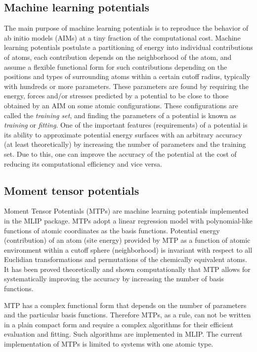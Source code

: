 \documentclass[12pt]{article}
\renewcommand{\_}{\char`_}
\begin{document}
\subsection{Machine learning potentials}

The main purpose of machine learning potentials is to reproduce the behavior of ab initio models (AIMs) at a tiny fraction of the computational cost.
Machine learning potentials postulate a partitioning of energy into individual contributions of atoms, each contribution depends on the neighborhood of the atom, and assume a flexible functional form for such contributions depending on the positions and types of surrounding atoms within a certain cutoff radius, typically with hundreds or more parameters. These parameters are found by requiring the energy, forces and/or stresses predicted by a potential to be close to those obtained by an AIM on some atomic configurations. These configurations are called the \emph{training set}, and finding the parameters of a potential is known as \emph{training} or \emph{fitting}. One of the important features (requirements) of a potential is its ability to approximate potential energy surfaces with an arbitrary accuracy (at least theoretically) by increasing the number of parameters and the training set. Due to this, one can improve the accuracy of the potential at the cost of reducing its computational efficiency and vice versa.

\subsection{Moment tensor potentials}

Moment Tensor Potentials (MTPs) \cite{Shapeev2016-MTP} are machine learning potentials implemented in the MLIP package. MTPs adopt a linear regression model with polynomial-like functions of atomic coordinates as the basis functions.
Potential energy (contribution) of an atom (site energy) provided by MTP as a function of atomic environment within a cutoff sphere (neighborhood) is invariant with respect to all Euclidian transformations and permutations of the chemically equivalent atoms. It has been proved theoretically and shown computationally that MTP allows for systematically improving the accuracy by increasing the number of basis functions.

MTP has a complex functional form that depends on the number of parameters and the particular basis functions.
Therefore MTPs, as a rule, can not be written in a plain compact form and require a complex algorithms for their efficient evaluation and fitting.
Such algorithms are implemented in MLIP.
The current implementation of MTPs is limited to systems with one atomic type.
\end{document}
